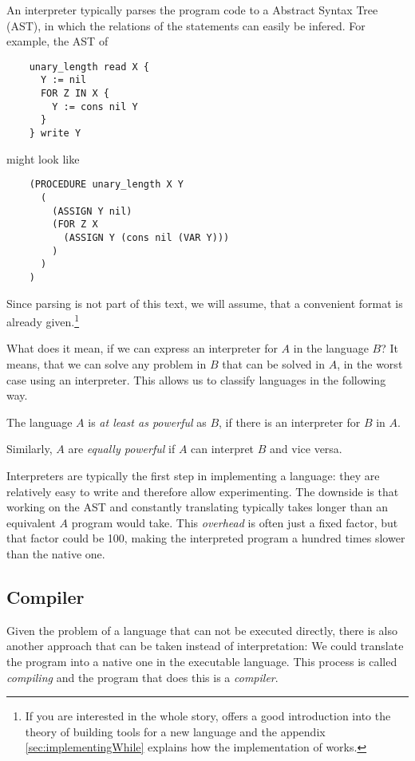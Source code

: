 An interpreter typically parses the program code to a Abstract Syntax Tree 
(AST), in which the relations of the statements can easily be infered. For 
example, the AST of

\begin{verbatim}
	unary_length read X {
	  Y := nil
	  FOR Z IN X {
	    Y := cons nil Y
	  }
	} write Y
\end{verbatim}

might look like

\begin{verbatim}
	(PROCEDURE unary_length X Y
	  (
	    (ASSIGN Y nil)
	    (FOR Z X
	      (ASSIGN Y (cons nil (VAR Y)))
	    )
	  )
	)
\end{verbatim}

Since parsing is not part of this text, we will assume, that a convenient 
format is already given.\footnote{If you are interested in the whole story, 
	\cite{aho2007compilers} offers a good introduction into the theory of
	building tools for a new language and the appendix
	\ref{sec:implementingWhile} explains how the implementation of \WHILE works.}

What does it mean, if we can express an interpreter for $A$ in the language 
$B$? It means, that we can solve any problem in $B$ that can be solved in $A$, 
in the worst case using an interpreter. This allows us to classify languages 
in the following way.

\begin{defn}
	The language $A$ is {\em at least as powerful} as $B$, if there is an 
	interpreter for $B$ in $A$.

	Similarly, $A$ are {\em equally powerful} if $A$ can interpret $B$ and vice versa.
\end{defn}

Interpreters are typically the first step in implementing a language: they 
are relatively easy to write and therefore allow experimenting. The downside 
is that working on the AST and constantly translating typically takes longer 
than an equivalent $A$ program would take. This {\em overhead} is often 
just a fixed factor, but that factor could be 100, making the interpreted program a 
hundred times slower than the native one.

\subsection{Compiler} %
\label{sub:Compiler}
Given the problem of a language that can not be executed directly, there is 
also another approach that can be taken instead of interpretation: We could 
translate the program into a native one in the executable language. This 
process is called {\em compiling} and the program that does this is a {\em
compiler}.

